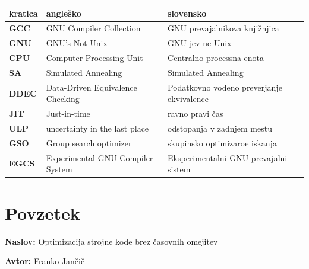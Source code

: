 \documentclass[a4paper, 12pt]{book}
\newcommand{\ttitle}{Optimizacija strojne kode brez časovnih omejitev}
\newcommand{\tauthor}{Franko Jančič}
\begin{document}

\noindent\begin{tabular}{p{}|p{}|p{}}    %
	{\bf kratica} & {\bf angleško} & {\bf slovensko} \\ \hline
	{\bf GCC}      & GNU Compiler Collection & GNU prevajalnikova knjižnjica \\
	{\bf GNU} & GNU's Not Unix & GNU-jev ne Unix \\
	{\bf CPU} & Computer Processing Unit & Centralno processna enota \\
	{\bf SA} & Simulated Annealing & Simulated Annealing \\
	{\bf DDEC} & Data-Driven Equivalence Checking & Podatkovno vodeno preverjanje ekvivalence  \\
	{\bf JIT} & Just-in-time & ravno pravi čas \\
	{\bf ULP} & uncertainty in the last place & odstopanja v zadnjem mestu \\
	{\bf GSO} & Group search optimizer  & skupinsko optimizaroe iskanja \\
	{\bf EGCS} & Experimental GNU Compiler System  & Eksperimentalni GNU prevajalni sistem \\
\end{tabular}
\chapter*{Povzetek}

\noindent\textbf{Naslov:} \ttitle
\bigskip

\noindent\textbf{Avtor:} \tauthor
\bigskip
\end{document}
